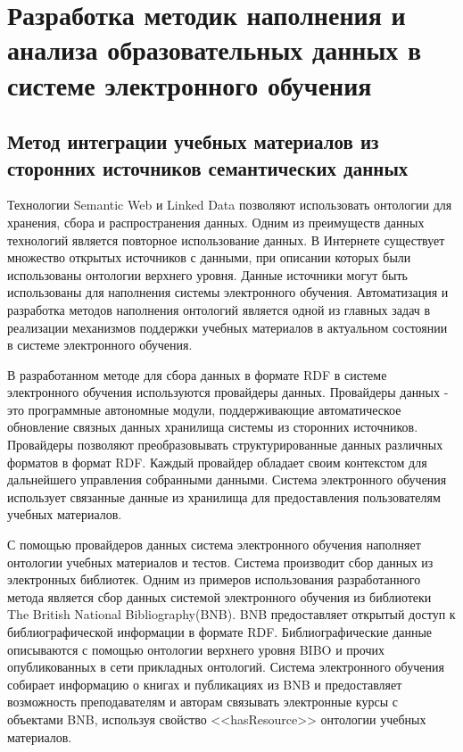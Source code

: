 \chapter{Разработка методик наполнения и анализа образовательных данных в системе электронного обучения} \label{chapt3}


\section{Метод интеграции учебных материалов из сторонних источников семантических данных} 
\label{sect3_1}

Технологии Semantic Web и Linked Data позволяют использовать онтологии для хранения, сбора и распространения данных. Одним из преимуществ данных технологий является повторное использование данных. В Интернете существует множество открытых источников с данными, при описании которых были использованы онтологии верхнего уровня. Данные источники могут быть использованы для наполнения системы электронного обучения. Автоматизация и разработка методов наполнения онтологий является одной из главных задач в реализации механизмов поддержки учебных материалов в актуальном состоянии в системе электронного обучения.

В разработанном методе для сбора данных в формате RDF в системе электронного обучения используются провайдеры данных. Провайдеры данных - это программные автономные модули, поддерживающие  автоматическое обновление связных данных хранилища системы из сторонних источников. Провайдеры позволяют преобразовывать структурированные данных различных форматов в формат RDF. Каждый провайдер обладает своим контекстом для дальнейшего управления собранными данными. Система электронного обучения использует связанные данные из хранилища для предоставления пользователям учебных материалов.

С помощью провайдеров данных система электронного обучения  наполняет онтологии учебных материалов и тестов. Система производит сбор данных из электронных библиотек. Одним из примеров использования разработанного метода является сбор данных системой электронного обучения из библиотеки The British National Bibliography(BNB). BNB предоставляет открытый доступ к библиографической информации в формате RDF. Библиографические данные описываются с помощью онтологии верхнего уровня BIBO и прочих опубликованных в сети прикладных онтологий. Система электронного обучения собирает информацию о книгах и публикациях из BNB и предоставляет возможность преподавателям и авторам  связывать электронные курсы с объектами BNB, используя свойство <<hasResource>> онтологии учебных материалов.

